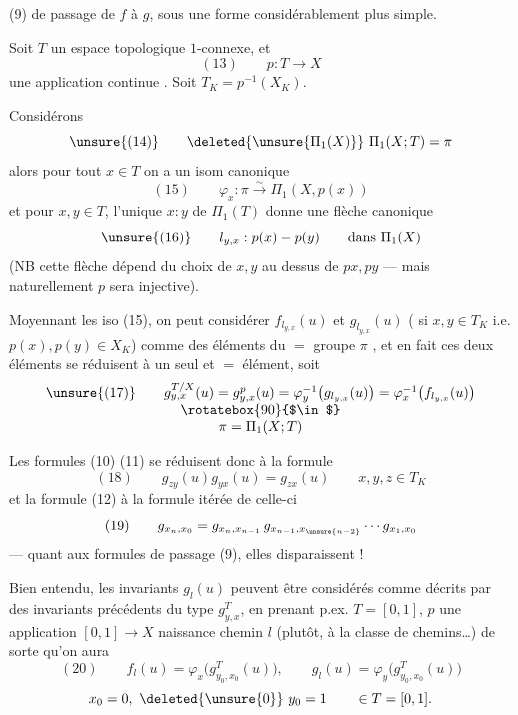 (9) de passage de $f$ à $g$, sous une forme considérablement plus simple.

Soit $T$ un espace topologique  $1$-connexe, et
\[
(13)\qquad p:T\longrightarrow X
\]
une application continue . Soit $T_K=p^{-1}(X_K)$.

Considérons 
\[
\unsure{(14)}\qquad\deleted{\unsure{\Pi_1(X)}}\ \Pi_1(X;T)=\pi
\]
alors pour tout $x\in T$ on a un isom canonique
\[
(15)\qquad\varphi_x:\pi\xrightarrow{\sim}\Pi_1(X,p(x))
\]
et pour $x,y\in T$, l'unique    $x:y$ de $\Pi_1(T)$ donne  une flèche canonique
\[
\unsure{(16)}\qquad l_{y,x}:p(x)\mathbin{-}p(y)\qquad\text{dans }\Pi_1(X)
\]
(NB cette flèche dépend du choix de $x,y$ au dessus de $px,py$ --- mais naturellement $p$ sera injective).

Moyennant les iso (15), on peut considérer $f_{l_{y,x}}(u)$ et $g_{l_{y,x}}(u)$ ( si $x,y\in T_K$ i.e. $p(x),p(y)\in X_K$) comme des éléments du $=$ groupe $\pi$ ,  et en fait ces deux éléments se réduisent à un seul et $=$ élément, soit
\[
\begin{array}{c}
\unsure{(17)}\qquad g_{y,x}^{T/X}(u)=g_{y,x}^{p}(u)=\varphi_y^{-1}\bigl(g_{l_{y,x}}(u)\bigr)=\varphi_x^{-1}\bigl(f_{l_{y,x}}(u)\bigr)\\
\rotatebox{90}{$\in$}\\
\pi=\Pi_1(X;T)
\end{array}
\]

Les formules (10) (11) se réduisent donc à la formule
\[
(18)\qquad g_{zy}(u)g_{yx}(u)=g_{zx}(u)\qquad x,y,z\in T_K
\]
et la formule (12) à la formule itérée de celle-ci
\[
(19)\qquad g_{x_n,x_0}=g_{x_n,x_{n-1}}\,g_{x_{n-1},x_{\unsure{n-2}}}\cdots g_{x_1,x_0}
\]
--- quant aux formules de passage (9), elles  disparaissent !

Bien entendu, les invariants $g_l(u)$  peuvent être considérés comme décrits par des invariants précédents du type $g_{y,x}^T$, en prenant  p.ex. $T=[0,1]$, $p$ une application $[0,1]\longrightarrow X$  naissance  chemin $l$ (plutôt, à la classe de chemins\ldots) de sorte qu'on aura
\[
(20)\qquad f_l(u)=\varphi_x\bigl(g_{y_0,x_0}^T(u)\bigr),\qquad g_l(u)=\varphi_y\bigl(g_{y_0,x_0}^T(u)\bigr)
\]
\[
x_0=0,\ \deleted{\unsure{0}}\ y_0=1\qquad\in T=[0,1].
\]

